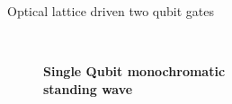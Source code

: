 \documentclass[final]{beamer}
\begin{document}
\begin{frame}{}
\begin{center}
\begin{columns}[t]
\begin{column}{0.49\textwidth}
\begin{alertblock}{Optical lattice driven two qubit gates}
\begin{minipage}{0.60\linewidth}
\begin{itemize}
\begin{figure}
      \end{figure}
      \end{itemize}
      \end{minipage}
      ~
      \begin{minipage}{0.37\linewidth}
      \begin{figure}
        \textbf{\large Single Qubit monochromatic\\ standing wave\normalsize}
      \end{figure}
      \end{minipage}
      \begin{figure}

\end{figure}
\end{alertblock}
\end{column}
\end{columns}
\end{center}
\end{frame}
\end{document}
